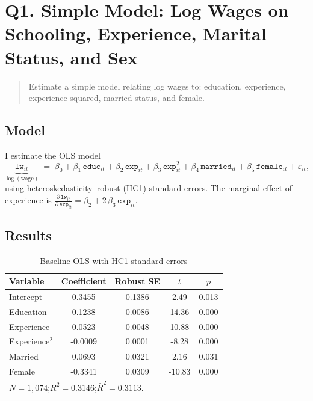 \documentclass[12pt]{article}
\begin{document}
\bigskip

\section*{Q1. Simple Model: Log Wages on Schooling, Experience, Marital Status, and Sex}

\begin{quote}
Estimate a simple model relating log wages to: education, experience, experience-squared, married status, and female.
\end{quote}

\subsection*{Model}
I estimate the OLS model
\[
  \underbrace{\texttt{lw}_{it}}_{\log(\text{wage})}
  \;=\;
  \beta_0
  + \beta_1\,\texttt{educ}_{it}
  + \beta_2\,\texttt{exp}_{it}
  + \beta_3\,\texttt{exp}_{it}^{2}
  + \beta_4\,\texttt{married}_{it}
  + \beta_5\,\texttt{female}_{it}
  + \varepsilon_{it},
\]
using heteroskedasticity–robust (HC1) standard errors. The marginal effect of experience is
\( \frac{\partial\,\texttt{lw}_{it}}{\partial\,\texttt{exp}_{it}} = \beta_2 + 2\,\beta_3\,\texttt{exp}_{it} \).

\subsection*{Results}
\begin{table}[h!]
  \centering
  \caption{Baseline OLS with HC1 standard errors}
  \label{tab:q1_ols}
  \begin{tabular}{l
                  S[table-format=1.4]
                  S[table-format=1.4]
                  S[table-format=2.2]
                  S[table-format=1.3]}
    \toprule
    Variable & {Coefficient} & {Robust SE} & {$t$} & {$p$} \\
    \midrule
    Intercept       & 0.3455 & 0.1386 &  2.49 & 0.013 \\
    Education       & 0.1238 & 0.0086 & 14.36 & 0.000 \\
    Experience      & 0.0523 & 0.0048 & 10.88 & 0.000 \\
    Experience$^{2}$& -0.0009& 0.0001 & -8.28 & 0.000 \\
    Married         & 0.0693 & 0.0321 &  2.16 & 0.031 \\
    Female          & -0.3341& 0.0309 & -10.83& 0.000 \\
    \midrule
     \\
    \bottomrule
  \end{tabular}
\end{table}
\end{document}
